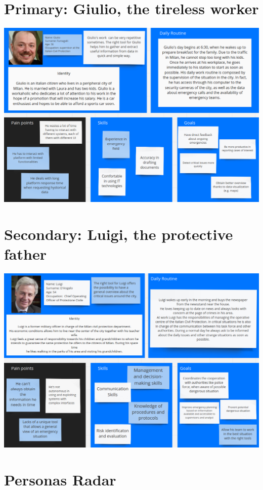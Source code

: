 \documentclass[../main.tex]{subfiles}
\begin{document}
    \section{Primary: Giulio, the tireless worker}\label{sec:primary-persona}
    \includegraphics[scale = 0.45]{assets/primary.png}
    \section{Secondary: Luigi, the protective father}\label{sec:secondary-persona}
    \includegraphics[scale = 0.45]{assets/secondary.png}
    \section{Personas Radar}\label{sec:personas-radar}
\end{document}
